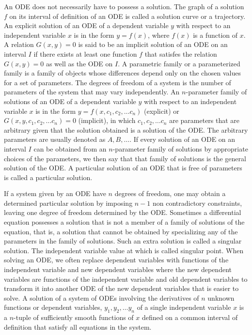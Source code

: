 \documentclass[a4paper,12pt]{report}
\begin{document}
An ODE does not necessarily have to possess a solution.
The graph of a solution $f$ on its interval of definition of an ODE is called a solution curve or a trajectory.
An explicit solution of an ODE of a dependent variable $y$ with respect to an independent variable $x$ is in the form $y=f(x)$, where $f(x)$ is a function of $x$.
A relation $G(x, y) = 0$ is said to be an implicit solution of an ODE on an interval $I$ if there exists at least one function $f$ that satisfes the relation $G(x, y) = 0$ as well as the ODE on $I$.
A parametric family or a parameterized family is a family of objects whose differences depend only on the chosen values for a set of parameters.
The degrees of freedom of a system is the number of parameters of the system that may vary independently.
An $n$-parameter family of solutions of an ODE of a dependent variable $y$ with respect to an independent variable $x$ is in the form $y=f(x,c_1,c_2,\dots c_n)$ (explicit) or $G(x,y,c_1,c_2,\dots c_n)=0$ (implicit), in which $c_1,c_2,\dots c_n$ are parameters that are arbitrary given that the solution obtained is a solution of the ODE. The arbitrary parameters are usually denoted as $A,B,\ldots$.
If every solution of an ODE on an interval $I$ can be obtained from an $n$-parameter family of solutions by appropriate choices of the parameters, we then say that that family of solutions is the general solution of the ODE.
A particular solution of an ODE that is free of parameters is called a particular solution.

If a system given by an ODE have $n$ degrees of freedom, one may obtain a determined particular solution by imposing $n-1$ non contradictory constraints, leaving one degree of freedom determined by the ODE.
Sometimes a differential equation possesses a solution that is not a member of a family of solutions of the equation, that is, a solution that cannot be obtained by specializing any of the parameters in the family of solutions. Such an extra solution is called a singular solution. The independent variable value at which is called singular point.
When solving an ODE, we often replace dependent variables with functions of the independent variable and new dependent variables where the new dependent variables are functions of the independent variable and old dependent variables to transform it into another ODE of the new dependent variables that is easier to solve.
A solution of a system of ODEs involving the derivatives of $n$ unknown functions or dependent variables, $y_1,y_2,\dots y_n$ of a single independent variable $x$ is a $n$-tuple of sufficiently smooth functions of $x$ defined on a common interval of definition that satisfy all equations in the system.
\end{document}
